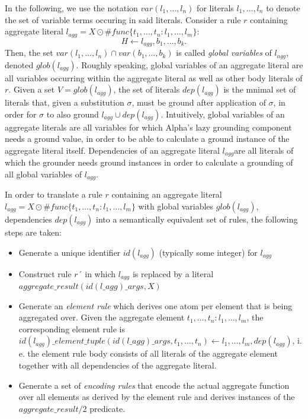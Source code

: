 \begin{definition}
In the following, we use the notation $var(l_1,\ldots,l_n)$ for literals $l_1,\ldots,l_n$ to denote the set of variable terms occuring in said literals. Consider a rule $r$ containing aggregate literal $l_{agg} =  X \odot \#\mathit{func}\{t_1,\ldots,t_n : l_1,\ldots,l_m\}$:
\[
    H \leftarrow l_{agg}, b_1,\ldots,b_k.
\]
Then, the set $var(l_1,\ldots,l_n) \cap var(b_1,\ldots, b_k)$ is called \emph{global variables} of $l_{agg}$, denoted $glob(l_{agg})$. Roughly speaking, global variables of an aggregate literal are all variables occurring within the aggregate literal as well as other body literals of $r$. Given a set $V = glob(l_{agg})$, the set of literals $dep(l_{agg})$ is the mnimal set of literals that, given a substitution $\sigma$, must be ground after application of $\sigma$, in order for $\sigma$ to also ground $l_{agg} \cup dep(l_{agg})$.
Intuitively, global variables of an aggregate literals are all variables for which Alpha's lazy grounding component needs a ground value, in order to be able to calculate a ground instance of the aggregate literal itself. Dependencies of an aggregate literal $l_{agg}$are all literals of which the grounder needs ground instances in order to calculate a grounding of all global variables of $l_{agg}$.
\end{definition} 

In order to translate a rule $r$ containing an aggregate literal $l_{agg} = X \odot \#\mathit{func}\{t_1,\ldots,t_n : l_1,\ldots,l_m\}$ with global variables $glob(l_{agg})$, dependencies $dep(l_{agg})$ into a semantically equivalent set of rules, the following steps are taken:
\begin{itemize}
    \item Generate a unique identifier $id(l_{agg})$ (typically some integer) for $l_{agg}$
    \item Construct rule $r´$ in which $l_{agg}$ is replaced by a literal $aggregate\_result(id(l\_{agg})\_args, X)$
    \item Generate an \emph{element rule} which derives one atom per element that is being aggregated over. Given the aggregate element $t_1,\ldots,t_n : l_1,\ldots,l_m$, the corresponding element rule is $id(l_{agg})\_element\_tuple(id(l\_{agg})\_args, t_1,\ldots,t_n) \leftarrow l_1,\ldots,l_m, dep(l_{agg})$, i. e. the element rule body consists of all literals of the aggregate element together with all dependencies of the aggregate literal.
    \item Generate a set of \emph{encoding rules} that encode the actual aggregate function over all elements as derived by the element rule and derives instances of the $aggregate\_result/2$ predicate.
\end{itemize}     


